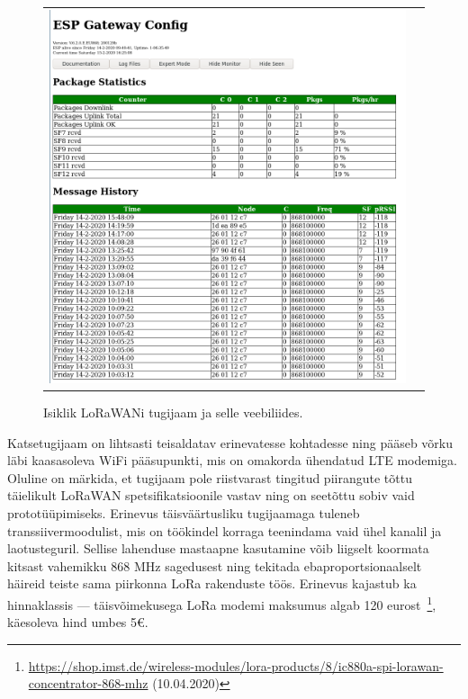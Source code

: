 \documentclass[12pt]{article}
\begin{document}
\begin{figure} [htbp]
\begin{tabular}{c c}
\begin{minipage}{0.53\textwidth}
                \includegraphics[width=\textwidth]{figures/ttn-jaama-liides.png}
            \end{minipage}
        \end{tabular}
        \caption{Isiklik LoRaWANi tugijaam ja selle veebiliides.}
        \label{fig:omatugijaam}
    \end{figure}

    Katsetugijaam on lihtsasti teisaldatav erinevatesse kohtadesse ning pääseb võrku läbi kaasasoleva WiFi pääsupunkti, mis on omakorda ühendatud LTE modemiga.
    Oluline on märkida, et tugijaam pole riistvarast tingitud piirangute tõttu täielikult LoRaWAN spetsifikatsioonile vastav ning on seetõttu sobiv vaid prototüüpimiseks.
    Erinevus täisväärtusliku tugijaamaga tuleneb transsiivermoodulist, mis on töökindel korraga teenindama vaid ühel kanalil ja laotusteguril.
    Sellise lahenduse mastaapne kasutamine võib liigselt koormata kitsast vahemikku 868 MHz sagedusest ning tekitada ebaproportsionaalselt häireid teiste sama piirkonna LoRa rakenduste töös.
    Erinevus kajastub ka hinnaklassis — täisvõimekusega LoRa modemi maksumus algab 120 eurost~\footnote{\url{https://shop.imst.de/wireless-modules/lora-products/8/ic880a-spi-lorawan-concentrator-868-mhz} (10.04.2020)}, käesoleva hind umbes 5€.
\end{document}
